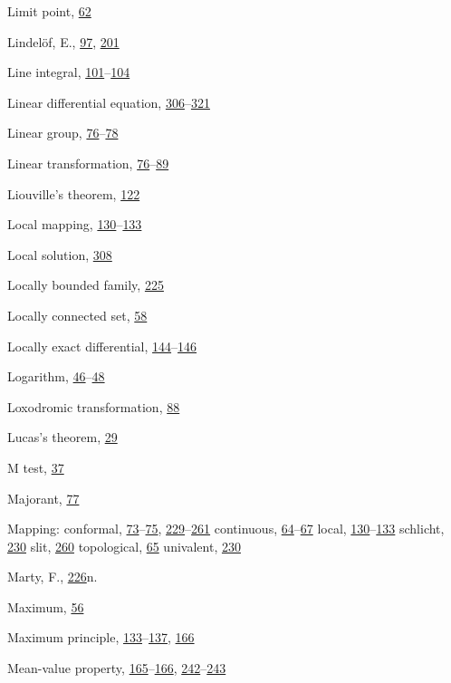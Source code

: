\begin{theindex}
\item Limit point, \hyperlink{orig-p62}{62}
\item Lindelöf, E., \hyperlink{orig-p97}{97}, \hyperlink{orig-p201}{201}
\item Line integral, \hyperlink{orig-p101}{101}--\hyperlink{orig-p104}{104}
\item Linear differential equation, \hyperlink{orig-p306}{306}--\hyperlink{orig-p321}{321}
\item Linear group, \hyperlink{orig-p76}{76}--\hyperlink{orig-p78}{78}
\item Linear transformation, \hyperlink{orig-p76}{76}--\hyperlink{orig-p89}{89}
\item Liouville's theorem, \hyperlink{orig-p122}{122}
\item Local mapping, \hyperlink{orig-p130}{130}--\hyperlink{orig-p133}{133}
\item Local solution, \hyperlink{orig-p308}{308}
\item Locally bounded family, \hyperlink{orig-p225}{225}
\item Locally connected set, \hyperlink{orig-p58}{58}
\item Locally exact differential, \hyperlink{orig-p144}{144}--\hyperlink{orig-p146}{146}
\item Logarithm, \hyperlink{orig-p46}{46}--\hyperlink{orig-p48}{48}
\item Loxodromic transformation, \hyperlink{orig-p88}{88}
\item Lucas's theorem, \hyperlink{orig-p29}{29}
\item M test, \hyperlink{orig-p37}{37}
\item Majorant, \hyperlink{orig-p77}{77}
\item Mapping:
\subitem conformal, \hyperlink{orig-p73}{73}--\hyperlink{orig-p75}{75}, \hyperlink{orig-p229}{229}--\hyperlink{orig-p261}{261}
\subitem continuous, \hyperlink{orig-p64}{64}--\hyperlink{orig-p67}{67}
\subitem local, \hyperlink{orig-p130}{130}--\hyperlink{orig-p133}{133}
\subitem schlicht, \hyperlink{orig-p230}{230}
\subitem slit, \hyperlink{orig-p260}{260}
\subitem topological, \hyperlink{orig-p65}{65}
\subitem univalent, \hyperlink{orig-p230}{230}
\item Marty, F., \hyperlink{orig-p226}{226}n.
\item Maximum, \hyperlink{orig-p56}{56}
\item Maximum principle, \hyperlink{orig-p133}{133}--\hyperlink{orig-p137}{137}, \hyperlink{orig-p166}{166}
\item Mean-value property, \hyperlink{orig-p165}{165}--\hyperlink{orig-p166}{166}, \hyperlink{orig-p242}{242}--\hyperlink{orig-p243}{243}

\end{theindex}
